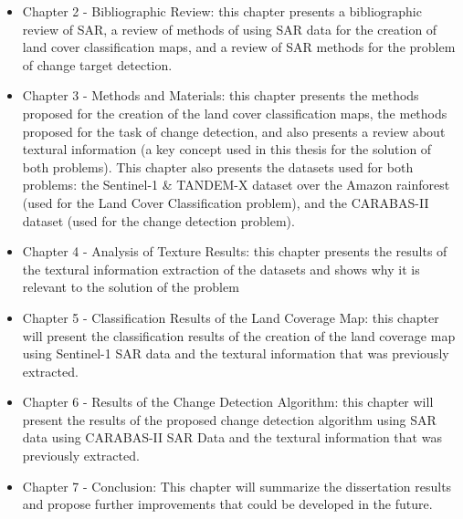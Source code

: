 \begin{itemize}
    \item Chapter 2 - Bibliographic Review: this chapter presents a bibliographic review of SAR, a review of methods of using SAR data for the creation
          of land cover classification maps, and a review of SAR methods for the problem of change target detection.
    \item Chapter 3 - Methods and Materials: this chapter presents the methods proposed for the creation of the land cover classification maps, the methods proposed for the
          task of change detection, and also presents a review about textural information (a key concept used in this thesis for the solution of both problems). This chapter also presents
          the datasets used for both problems: the Sentinel-1 \& TANDEM-X dataset over the Amazon rainforest (used for the Land Cover Classification problem), and the CARABAS-II dataset (used for the change detection problem).
    \item Chapter 4 - Analysis of Texture Results: this chapter presents the results of the textural information extraction of the datasets and shows why it is relevant to the solution of the problem
    \item Chapter 5 - Classification Results of the Land Coverage Map: this chapter will present the classification results of the creation of the land coverage map using Sentinel-1 SAR data and the textural information that was previously extracted.
    \item Chapter 6 - Results of the Change Detection Algorithm: this chapter will present the results of the proposed change detection algorithm using SAR data using CARABAS-II SAR Data and the textural information that was previously extracted.
    \item Chapter 7 - Conclusion: This chapter will summarize the dissertation results and propose further improvements that could be developed in the future.
\end{itemize}

